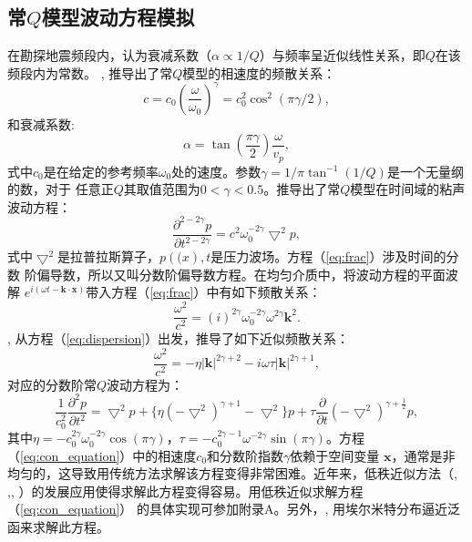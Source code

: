 \subsection{常$Q$模型波动方程模拟}
在勘探地震频段内，认为衰减系数（$\alpha\propto 1/Q$）与频率呈近似线性关系，即$Q$在该频段内为常数。
, 推导出了常$Q$模型的相速度的频散关系：
\begin{equation}
	c=c_0(\frac{\omega}{\omega_0})^\gamma=c_0^2\cos^2(\pi\gamma/2),
\end{equation}
和衰减系数:
\begin{equation}
	\alpha=\tan(\frac{\pi\gamma}{2})\frac{\omega}{v_p},
\end{equation}
式中$c_0$是在给定的参考频率$\omega_0$处的速度。参数$\gamma=1/\pi\tan^{-1}(1/Q)$是一个无量纲的数，对于
任意正$Q$其取值范围为$0<\gamma<0.5$。推导出了常$Q$模型在时间域的粘声波动方程：
\begin{equation}
	\frac{\partial^{2-2\gamma}p}{\partial t^{2-2\gamma}}=c^2\omega_0^{-2\gamma}\bigtriangledown^2p,
	\label{eq:frac}
\end{equation}
式中$\bigtriangledown^2$是拉普拉斯算子，$p(\mathbf(x),t$是压力波场。方程（\ref{eq:frac}）涉及时间的分数
阶偏导数，所以又叫分数阶偏导数方程。在均匀介质中，将波动方程的平面波解
$e^{i(\omega t-\mathbf{k}\cdot\mathbf{x})}$带入方程（\ref{eq:frac}）中有如下频散关系：
\begin{equation}
	\frac{\omega^2}{c^2}=(i)^{2\gamma}\omega_0^{-2\gamma}\omega^{2\gamma}\mathbf{k}^2.
	\label{eq:dispersion}
\end{equation}
, 从方程（\ref{eq:dispersion}）出发，推导了如下近似频散关系：
\begin{equation}
	\frac{\omega^2}{c^2}=-\eta|\mathbf{k}|^{2\gamma+2}-i\omega\tau|\mathbf{k}|^{2\gamma+1},
	\label{eq:dispersion1}
\end{equation}
对应的分数阶常$Q$波动方程为：
\begin{equation}
	\frac{1}{c_0^2}\frac{\partial^2p}{\partial t^2}=\bigtriangledown^2p + \{\eta(-\bigtriangledown^2)^
	{\gamma+1}-\bigtriangledown^2\}p + \tau\frac{\partial}{\partial t}(-\bigtriangledown^2)^{\gamma+
	\frac{1}{2}}p,
	\label{eq:con_equation}
\end{equation}
其中$\eta=-c_0^{2\gamma}\omega_0^{-2\gamma}\cos(\pi\gamma)$，$\tau=-c_0^{2\gamma-1}\omega^{-2\gamma}
\sin(\pi\gamma)$。方程（\ref{eq:con_equation}）中的相速度$c_0$和分数阶指数$\gamma$依赖于空间变量
$\mathbf{x}$，通常是非均匀的，这导致用传统方法求解该方程变得非常困难。近年来，低秩近似方法（, 
,, ）的发展应用使得求解此方程变得容易。用低秩近似求解方程（\ref{eq:con_equation}）
的具体实现可参加附录A。另外，, 用埃尔米特分布逼近泛函来求解此方程。



